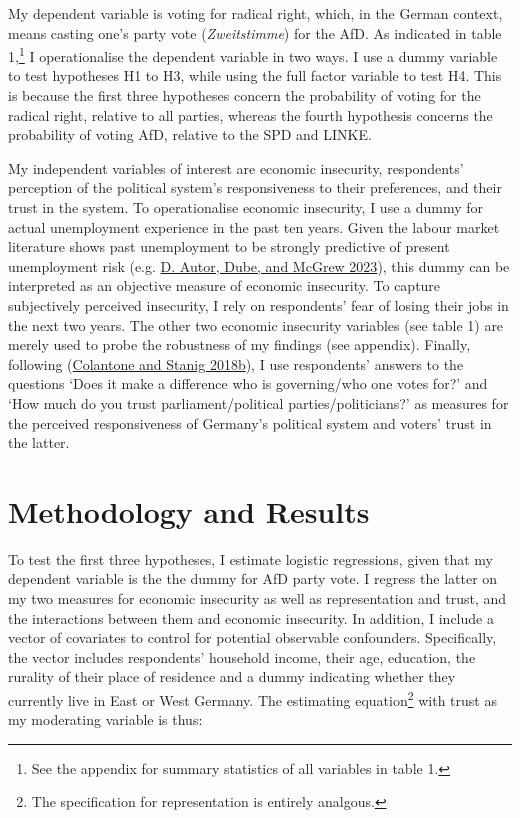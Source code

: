 \documentclass[
]{article}
\begin{document}
My dependent variable is voting for radical right, which, in the German
context, means casting one's party vote (\emph{Zweitstimme}) for the
AfD. As indicated in table 1,\footnote{See the appendix for summary
  statistics of all variables in table 1.} I operationalise the
dependent variable in two ways. I use a dummy variable to test
hypotheses H1 to H3, while using the full factor variable to test H4.
This is because the first three hypotheses concern the probability of
voting for the radical right, relative to all parties, whereas the
fourth hypothesis concerns the probability of voting AfD, relative to
the SPD and LINKE.

My independent variables of interest are economic insecurity,
respondents' perception of the political system's responsiveness to
their preferences, and their trust in the system. To operationalise
economic insecurity, I use a dummy for actual unemployment experience in
the past ten years. Given the labour market literature shows past
unemployment to be strongly predictive of present unemployment risk
(e.g. \protect\hyperlink{ref-autor_unexpected_2023}{D. Autor, Dube, and
McGrew 2023}), this dummy can be interpreted as an objective measure of
economic insecurity. To capture subjectively perceived insecurity, I
rely on respondents' fear of losing their jobs in the next two years.
The other two economic insecurity variables (see table 1) are merely
used to probe the robustness of my findings (see appendix). Finally,
following (\protect\hyperlink{ref-colantone_global_2018}{Colantone and
Stanig 2018b}), I use respondents' answers to the questions `Does it
make a difference who is governing/who one votes for?' and `How much do
you trust parliament/political parties/politicians?' as measures for the
perceived responsiveness of Germany's political system and voters' trust
in the latter.

\hypertarget{methodology-and-results}{%
\section{Methodology and Results}\label{methodology-and-results}}

To test the first three hypotheses, I estimate logistic regressions,
given that my dependent variable is the the dummy for AfD party vote. I
regress the latter on my two measures for economic insecurity as well as
representation and trust, and the interactions between them and economic
insecurity. In addition, I include a vector of covariates to control for
potential observable confounders. Specifically, the vector includes
respondents' household income, their age, education, the rurality of
their place of residence and a dummy indicating whether they currently
live in East or West Germany. The estimating equation\footnote{The
  specification for representation is entirely analgous.} with trust as
my moderating variable is thus:
\end{document}
